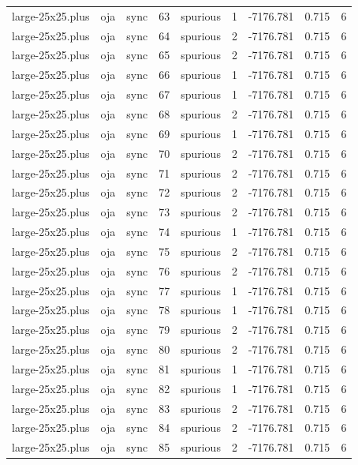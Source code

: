 \begin{tabular}{lllrlrrrr}
large-25x25.plus & oja & sync & 63 & spurious & 1 & -7176.781 & 0.715 & 6 \\
large-25x25.plus & oja & sync & 64 & spurious & 2 & -7176.781 & 0.715 & 6 \\
large-25x25.plus & oja & sync & 65 & spurious & 2 & -7176.781 & 0.715 & 6 \\
large-25x25.plus & oja & sync & 66 & spurious & 1 & -7176.781 & 0.715 & 6 \\
large-25x25.plus & oja & sync & 67 & spurious & 1 & -7176.781 & 0.715 & 6 \\
large-25x25.plus & oja & sync & 68 & spurious & 2 & -7176.781 & 0.715 & 6 \\
large-25x25.plus & oja & sync & 69 & spurious & 1 & -7176.781 & 0.715 & 6 \\
large-25x25.plus & oja & sync & 70 & spurious & 2 & -7176.781 & 0.715 & 6 \\
large-25x25.plus & oja & sync & 71 & spurious & 2 & -7176.781 & 0.715 & 6 \\
large-25x25.plus & oja & sync & 72 & spurious & 2 & -7176.781 & 0.715 & 6 \\
large-25x25.plus & oja & sync & 73 & spurious & 2 & -7176.781 & 0.715 & 6 \\
large-25x25.plus & oja & sync & 74 & spurious & 1 & -7176.781 & 0.715 & 6 \\
large-25x25.plus & oja & sync & 75 & spurious & 2 & -7176.781 & 0.715 & 6 \\
large-25x25.plus & oja & sync & 76 & spurious & 2 & -7176.781 & 0.715 & 6 \\
large-25x25.plus & oja & sync & 77 & spurious & 1 & -7176.781 & 0.715 & 6 \\
large-25x25.plus & oja & sync & 78 & spurious & 1 & -7176.781 & 0.715 & 6 \\
large-25x25.plus & oja & sync & 79 & spurious & 2 & -7176.781 & 0.715 & 6 \\
large-25x25.plus & oja & sync & 80 & spurious & 2 & -7176.781 & 0.715 & 6 \\
large-25x25.plus & oja & sync & 81 & spurious & 1 & -7176.781 & 0.715 & 6 \\
large-25x25.plus & oja & sync & 82 & spurious & 1 & -7176.781 & 0.715 & 6 \\
large-25x25.plus & oja & sync & 83 & spurious & 2 & -7176.781 & 0.715 & 6 \\
large-25x25.plus & oja & sync & 84 & spurious & 2 & -7176.781 & 0.715 & 6 \\
large-25x25.plus & oja & sync & 85 & spurious & 2 & -7176.781 & 0.715 & 6 \\

\end{tabular}
